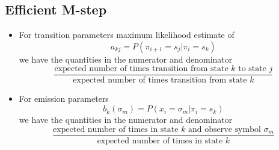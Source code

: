 \documentclass[10pt]{article}
\begin{document}
\subsection*{Efficient M-step}
\begin{itemize}
	\item For transition parameters maximum likelihood estimate of
	\[a_{kj} = P(\pi_{i + 1} = s_j | \pi_i = s_k)\]
    we have the quantities in the numerator and denominator
    \[\frac{\text{expected number of times transition from state $k$ to state $j$}}{\text{expected number of times transition from state $k$}}\]
    \item For emission parameters
    \[b_k(\sigma_m) = P(x_i = \sigma_m | \pi_i = s_k)\]
    we have the quantities in the numerator and denominator
    \[\frac{\text{expected number of times in state $k$ and observe symbol $\sigma_m$}}{\text{expected number of times in state $k$}}\]
\end{itemize}
\end{document}
